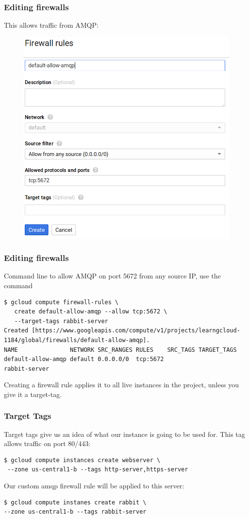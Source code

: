 \documentclass[9pt]{beamer}
\begin{document}
\begin{frame}[fragile]
  \frametitle{Editing firewalls}
  This allows traffic from AMQP:
  \begin{figure}
    \includegraphics[scale=0.2]{figures/DefineFirewall.png}
  \end{figure}
\end{frame}

\begin{frame}[fragile]
  \frametitle{Editing firewalls}
  Command line to allow AMQP on port 5672 from any source IP, use the command
\begin{verbatim}
$ gcloud compute firewall-rules \ 
   create default-allow-amqp --allow tcp:5672 \
   --target-tags rabbit-server
Created [https://www.googleapis.com/compute/v1/projects/learngcloud-1184/global/firewalls/default-allow-amqp].
NAME               NETWORK SRC_RANGES RULES    SRC_TAGS TARGET_TAGS
default-allow-amqp default 0.0.0.0/0  tcp:5672					  rabbit-server
\end{verbatim}
Creating a firewall rule applies it to all live instances in the project, unless you give it a target-tag.
\end{frame}

\begin{frame}[fragile]
\frametitle{Target Tags}
Target tags give us an idea of what our instance is going to be used for. This tag allows traffic on port 80/443:
\begin{verbatim}
$ gcloud compute instances create webserver \
 --zone us-central1-b --tags http-server,https-server
\end{verbatim}
Our custom amqp firewall rule will be applied to this server:
\begin{verbatim}
$ gcloud compute instanes create rabbit \
--zone us-central1-b --tags rabbit-server
\end{verbatim}
\end{frame}
\end{document}
